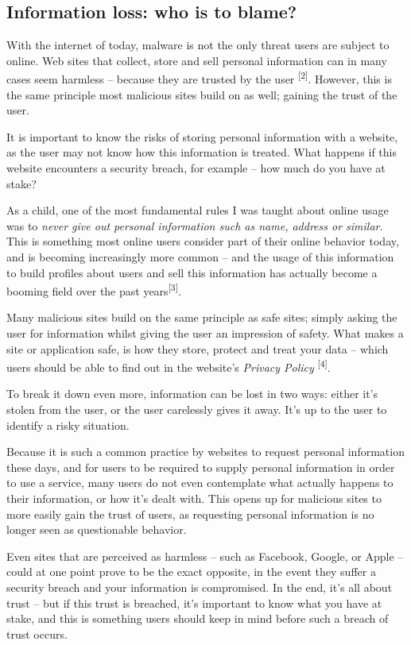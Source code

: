 \documentclass[twocolumn,letterpaper]{article}
\begin{document}
\subsection[Information loss: who is to blame?]{\bfseries \textup{Information loss: who is to blame?}}
With the internet of today, malware is not the only threat users are subject to online. Web sites that collect, store
and sell personal information can in many cases seem harmless – because they are trusted by the user
\textsuperscript{[2]}.\textbf{ }However, this is the same principle most malicious sites build on as well; gaining the
trust of the user.

It is important to know the risks of storing personal information with a website, as the user may not know how this
information is treated. What happens if this website encounters a security breach, for example – how much do you have
at stake? 

As a child, one of the most fundamental rules I was taught about online usage was to \textit{never give out personal
information such as name, address or similar}. This is something most online users consider part of their online
behavior today, and is becoming increasingly more common – and the usage of this information to build profiles about
users and sell this information has actually become a booming field over the past years\textsuperscript{[3]}.

Many malicious sites build on the same principle as safe sites; simply asking the user for information whilst giving the
user an impression of safety. What makes a site or application safe, is how they store, protect and treat your data –
which users should be able to find out in the website's \textit{Privacy Policy }\textsuperscript{[4]}.

To break it down even more, information can be lost in two ways: either it's stolen from the user, or the user
carelessly gives it away. It's up to the user to identify a risky situation. 

Because it is such a common practice by websites to request personal information these days, and for users to be
required to supply personal information in order to use a service, many users do not even contemplate what actually
happens to their information, or how it's dealt with. This opens up for malicious sites to more easily gain the trust
of users, as requesting personal information is no longer seen as questionable behavior. 

Even sites that are perceived as harmless – such as Facebook, Google, or Apple – could at one point prove to be the
exact opposite, in the event they suffer a security breach and your information is compromised. In the end, it's all
about trust – but if this trust is breached, it's important to know what you have at stake, and this is something users
should keep in mind before such a breach of trust occurs. 
\end{document}
